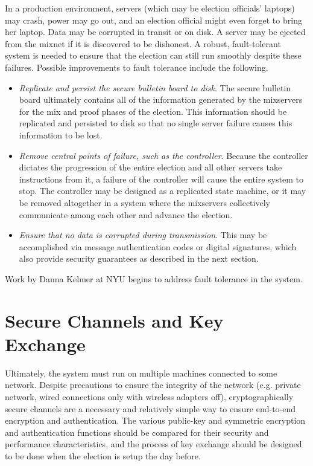 In a production environment, servers (which may be election officials' laptops) may crash, power may go out, and an election official might even forget to bring her laptop. Data may be corrupted in transit or on disk. A server may be ejected from the mixnet if it is discovered to be dishonest. A robust, fault-tolerant system is needed to ensure that the election can still run smoothly despite these failures. Possible improvements to fault tolerance include the following.
\begin{itemize}
\item \emph{Replicate and persist the secure bulletin board to disk}. The secure bulletin board ultimately contains all of the information generated by the mixservers for the mix and proof phases of the election. This information should be replicated and persisted to disk so that no single server failure causes this information to be lost.
\item \emph{Remove central points of failure, such as the controller}. Because the controller dictates the progression of the entire election and all other servers take instructions from it, a failure of the controller will cause the entire system to stop. The controller may be designed as a replicated state machine, or it may be removed altogether in a system where the mixservers collectively communicate among each other and advance the election.
\item \emph{Ensure that no data is corrupted during transmission}. This may be accomplished via message authentication codes or digital signatures, which also provide security guarantees as described in the next section.
\end{itemize}
Work by Danna Kelmer at NYU begins to address fault tolerance in the system.

\section{Secure Channels and Key Exchange}

Ultimately, the system must run on multiple machines connected to some network. Despite precautions to ensure the integrity of the network (e.g. private network, wired connections only with wireless adapters off), cryptographically secure channels are a necessary and relatively simple way to ensure end-to-end encryption and authentication. The various public-key and symmetric encryption and authentication functions should be compared for their security and performance characteristics, and the process of key exchange should be designed to be done when the election is setup the day before.
